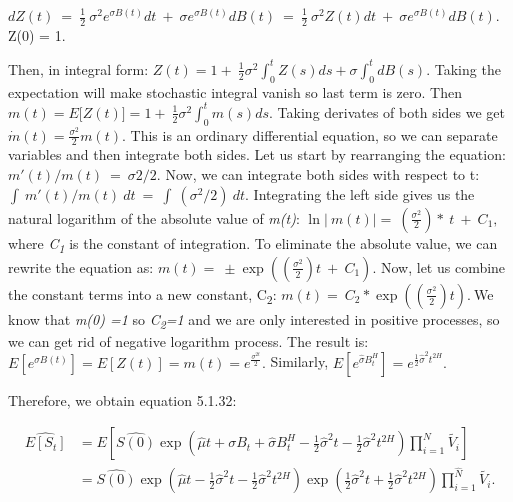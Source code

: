 \documentclass[12pt,a4paper]{report}
\numberwithin{equation}{section}
\begin{document}
\(dZ(t)\  = \ \frac{1}{2}\ \sigma^{2}e^{\sigma B(t)}dt\  + \ \sigma e^{\sigma B(t)}dB(t)\  = \ \frac{1}{2}\ \sigma^{2}Z(t)dt\  + \ \sigma e^{\sigma B(t)}dB(t).\)
Z(0) = 1.

Then, in integral form:
\(Z(t) = 1 + \ \frac{1}{2}\sigma^{2}\int_{0}^{t}{Z(s)ds + \sigma\int_{0}^{t}{dB(s).}}\)
Taking the expectation will make stochastic integral vanish so last term
is zero. Then
\(m(t) = E\lbrack Z(t)\rbrack = 1 + \ \frac{1}{2}\sigma^{2}\int_{0}^{t}{m(s)ds}\).
Taking derivates of both sides we get
\(\dot{m}(t) = \frac{\sigma^{2}}{2}m(t)\). This is an ordinary
differential equation, so we can separate variables and then integrate
both sides. Let us start by rearranging the equation:
\(m'(t)/m(t)\  = \ \sigma 2/2\). Now, we can integrate both sides with
respect to t: \(\int\ m'(t)/m(t)\ dt\  = \ \int\ (\sigma^{2}/2)\ dt.\)
Integrating the left side gives us the natural logarithm of the absolute
value of \emph{m(t)}:
\(\ln\left| \ m(t) \right| = \ \left( \frac{\sigma^{2}}{2} \right)*\ t\  + \ C_{1},\)
where \emph{C\textsubscript{1}} is the constant of integration. To eliminate the
absolute value, we can rewrite the equation as:
\(m(t) = \  \pm \exp\left( \left( \frac{\sigma^{2}}{2} \right)t\  + \ C_{1} \right).\)
Now, let us combine the constant terms into a new constant, C\textsubscript{2}:
\(m(t) = \ C_{2}*\exp\left( \left( \frac{\sigma^{2}}{2} \right)t \right).\ \)We
know that \emph{m(0) =1} so \emph{C\textsubscript{2}=1} and we are only
interested in positive processes, so we can get rid of negative
logarithm process. The result is:
\(E\left\lbrack e^{\sigma B(t)} \right\rbrack = E\left\lbrack Z(t) \right\rbrack = m(t) = e^{\frac{\sigma^{2t}}{2}}.\)
Similarly,
\(E\left\lbrack e^{\widehat{\sigma}B_{t}^{H}} \right\rbrack = e^{\frac{1}{2}{\widehat{\sigma}}^{2}t^{2H}}.\)

Therefore, we obtain equation 5.1.32:

\begin{equation}
\begin{aligned}
\widehat{E\!\left[S_t\right]}
&= E\!\left[\widehat{S(0)}\exp\!\left(\widehat{\mu}t + \sigma B_{t} + \widehat{\sigma}B_{t}^{H}
- \frac{1}{2}\widehat{\sigma}^{2}t - \frac{1}{2}\widehat{\sigma}^{2}t^{2H}\right)
\prod_{i=1}^{\widehat{N}}\widetilde{V_i}\right] \\
&= \widehat{S(0)}\exp\!\left(\widehat{\mu}t - \frac{1}{2}\widehat{\sigma}^{2}t - \frac{1}{2}\widehat{\sigma}^{2}t^{2H}\right)
\exp\!\left(\frac{1}{2}\widehat{\sigma}^{2}t + \frac{1}{2}\widehat{\sigma}^{2}t^{2H}\right)
\prod_{i=1}^{\widehat{N}}\widetilde{V_i}.
\end{aligned}
\tag{5.1.32}\label{eq:5.1.32}
\end{equation}
\end{document}
